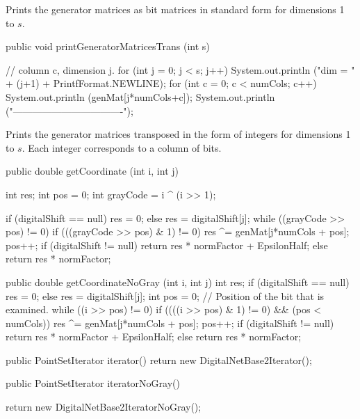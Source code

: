 \begin{tabb}
   Prints the generator matrices as bit matrices in standard form
   for dimensions 1 to $s$.
\end{tabb}
\begin{code}

   public void printGeneratorMatricesTrans (int s) \begin{hide} {
      // column c, dimension j.
      for (int j = 0; j < s; j++) {
         System.out.println ("dim = " + (j+1)  + PrintfFormat.NEWLINE);
            for (int c = 0; c < numCols; c++)
               System.out.println (genMat[j*numCols+c]);
         System.out.println ("----------------------------------");
      }
   }\end{hide}
\end{code}
\begin{tabb}
   Prints the generator matrices transposed in the form of integers
   for dimensions 1 to $s$. Each integer corresponds to a column of bits.
\end{tabb}
\begin{code}\begin{hide}

   public double getCoordinate (int i, int j) {
      int res;
      int pos = 0;
      int grayCode = i ^ (i >> 1);

      if (digitalShift == null)
         res = 0;
      else
         res = digitalShift[j];
      while ((grayCode >> pos) != 0) {
         if (((grayCode >> pos) & 1) != 0)
            res ^= genMat[j*numCols + pos];
         pos++;
      }
      if (digitalShift != null)
         return res * normFactor + EpsilonHalf;
      else
         return res * normFactor;
   }

   public double getCoordinateNoGray (int i, int j) {
      int res;
      if (digitalShift == null)
         res = 0;
      else
         res = digitalShift[j];
      int pos = 0;              // Position of the bit that is examined.
      while ((i >> pos) != 0) {
         if ((((i >> pos) & 1) != 0) && (pos < numCols))
            res ^= genMat[j*numCols + pos];
         pos++;
      }
      if (digitalShift != null)
         return res * normFactor + EpsilonHalf;
      else
         return res * normFactor;
   }

   public PointSetIterator iterator() {
      return new DigitalNetBase2Iterator();
   }\end{hide}

   public PointSetIterator iteratorNoGray()\begin{hide} {
      return new DigitalNetBase2IteratorNoGray();
   }\end{hide}
\end{code}
